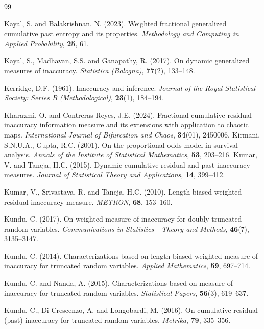 \documentclass[12pt,a4paper]{article}
\numberwithin{equation}{section}
\begin{document}
\begin{thebibliography}{99}
	
	Kayal, S. and Balakrishnan, N. (2023).
	Weighted fractional generalized cumulative past entropy and its properties.
	\textit{Methodology and Computing in Applied Probability}, \textbf{25}, 61.
	
	Kayal, S., Madhavan, S.S. and Ganapathy, R. (2017).
	On dynamic generalized measures of inaccuracy.
	\textit{Statistica (Bologna)}, \textbf{77}(2), 133--148.
	
	Kerridge, D.F. (1961).
	Inaccuracy and inference.
	\textit{Journal of the Royal Statistical Society: Series B (Methodological)}, \textbf{23}(1), 184--194.
	
	Kharazmi, O. and Contreras-Reyes, J.E. (2024).
	Fractional cumulative residual inaccuracy information measure and its extensions with application to chaotic maps.
	\textit{International Journal of Bifurcation and Chaos}, \textbf{34}(01), 2450006.
	Kirmani, S.N.U.A., Gupta, R.C. (2001). On the proportional odds model in survival analysis. \textit{Annals of the Institute of Statistical Mathematics}, \textbf{53}, 203--216. 
	Kumar, V. and Taneja, H.C. (2015).
	Dynamic cumulative residual and past inaccuracy measures.
	\textit{Journal of Statistical Theory and Applications}, \textbf{14}, 399--412.
	
	Kumar, V., Srivastava, R. and Taneja, H.C. (2010).
	Length biased weighted residual inaccuracy measure.
	\textit{METRON}, \textbf{68}, 153--160.
	
	Kundu, C. (2017).
	On weighted measure of inaccuracy for doubly truncated random variables.
	\textit{Communications in Statistics - Theory and Methods}, \textbf{46}(7), 3135--3147.
	
	Kundu, C. (2014).
	Characterizations based on length-biased weighted measure of inaccuracy for truncated random variables.
	\textit{Applied Mathematics}, \textbf{59}, 697--714.
	
	Kundu, C. and Nanda, A. (2015).
	Characterizations based on measure of inaccuracy for truncated random variables.
	\textit{Statistical Papers}, \textbf{56}(3), 619--637.
	
	Kundu, C., Di Crescenzo, A. and Longobardi, M. (2016).
	On cumulative residual (past) inaccuracy for truncated random variables.
	\textit{Metrika}, \textbf{79}, 335--356.
	

\end{thebibliography}
\end{document}
